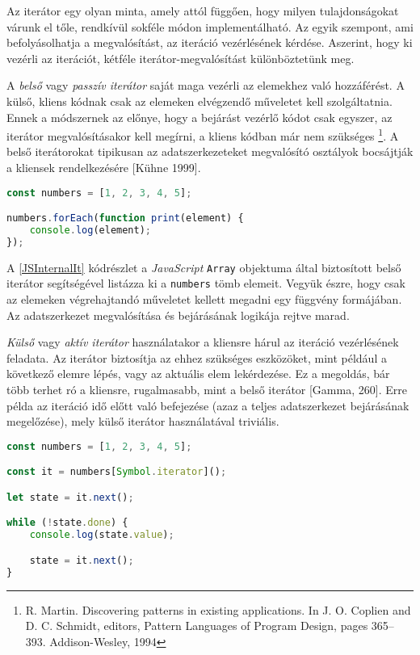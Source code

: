 Az iterátor egy olyan minta, amely attól függően, hogy milyen tulajdonságokat várunk el tőle, rendkívül sokféle módon implementálható. Az egyik szempont, ami befolyásolhatja a megvalósítást, az iteráció vezérlésének kérdése. Aszerint, hogy ki vezérli az iterációt, kétféle iterátor-megvalósítást különböztetünk meg.

A \textit{belső} vagy \textit{passzív iterátor} saját maga vezérli az elemekhez való hozzáférést. A külső, kliens kódnak csak az elemeken elvégzendő műveletet kell szolgáltatnia. Ennek a módszernek az előnye, hogy a bejárást vezérlő kódot csak egyszer, az iterátor megvalósításakor kell megírni, a kliens kódban már nem szükséges \footnote{R. Martin. Discovering patterns in existing applications. In J. O. Coplien and D. C. Schmidt, editors, Pattern Languages of Program Design, pages 365–393. Addison-Wesley, 1994}. A belső iterátorokat tipikusan az adatszerkezeteket megvalósító osztályok bocsájtják a kliensek rendelkezésére [Kühne 1999].

\begin{lstlisting}[language=JavaScript, caption={Tömb elemeinek kilistázása belső iterátorral JavaScriptben}, captionpos=b, label=JSInternalIt]
const numbers = [1, 2, 3, 4, 5];

numbers.forEach(function print(element) {
    console.log(element);
});
\end{lstlisting}

A \ref{JSInternalIt} kódrészlet a \textit{JavaScript} \texttt{Array} objektuma által biztosított belső iterátor segítségével listázza ki a \texttt{numbers} tömb elemeit. Vegyük észre, hogy csak az elemeken végrehajtandó műveletet kellett megadni egy függvény formájában. Az adatszerkezet megvalósítása és bejárásának logikája rejtve marad.

\textit{Külső} vagy \textit{aktív iterátor} használatakor a kliensre hárul az iteráció vezérlésének feladata. Az iterátor biztosítja az ehhez szükséges eszközöket, mint például a következő elemre lépés, vagy az aktuális elem lekérdezése. Ez a megoldás, bár több terhet ró a kliensre, rugalmasabb, mint a belső iterátor [Gamma, 260]. Erre példa az iteráció idő előtt való befejezése (azaz a teljes adatszerkezet bejárásának megelőzése), mely külső iterátor használatával triviális. 

\begin{lstlisting}[language=JavaScript, caption={Tömb elemeinek kilistázása külső iterátorral JavaScriptben}, captionpos=b, label=JSExternalIt]
const numbers = [1, 2, 3, 4, 5];

const it = numbers[Symbol.iterator]();

let state = it.next();

while (!state.done) {
    console.log(state.value);

    state = it.next();
}
\end{lstlisting}

